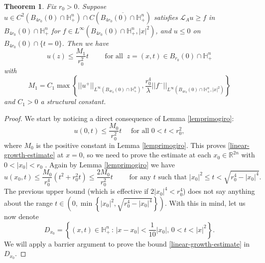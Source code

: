 \documentclass[12pt]{amsart}
\newtheorem{Theorem}{Theorem}[section]
\newcommand{\R}{{\mathbb R}}
\def \H {{\mathbb H}}
\def \L {\mathcal{L}}
\begin{document}
\begin{Theorem}\label{primadinocond}
Fix $r_0>0$. Suppose $u\in C^2(B_{4r_0}(0)\cap\H^n_+)\cap C(\overline{B_{4r_0}(0)\cap\H^n_+})$ satisfies $\L_A u \geq f$ in $B_{4r_0}(0)\cap\H^n_+$ for $f \in L^{\infty}(B_{4r_0}(0)\cap\H^n_+,|x|^2)$, and $u\leq 0$ on $B_{4r_0}(0) \cap \{t=0\}$. Then we have
\begin{equation}\label{linear-growth-estimate}
u(z)\leq \frac{M_1}{r^2_0} t \qquad \text{ for all } \ z=(x,t) \in B_{r_0}(0)\cap \H^n_+
\end{equation}
with
$$M_1=C_1\max\left\{ ||u^+||_{L^{\infty}(B_{4r_0}(0)\cap\H^n_+)}, 
\frac{r_0^4}{\lambda}||f^-||_{L^{\infty}(B_{4r_0}(0)\cap\H^n_+,|x|^2)}\right\}$$
and $C_1>0$ a structural constant.
\end{Theorem}
\begin{proof}
We start by noticing a direct consequence of Lemma \ref{lemprimogiro}:
\begin{equation}\label{atzero}
u(0,t)\leq \frac{M_0}{r^2_0} t \quad \text{ for all } 0<t<r_0^2,
\end{equation}
where $M_0$ is the positive constant in Lemma \ref{lemprimogiro}. This proves \eqref{linear-growth-estimate} at $x = 0$, so we need to prove the estimate at each $x_0\in\R^{2n}$ with $0<|x_0|<r_0$ . Again by Lemma \ref{lemprimogiro} we have
\begin{equation}\label{atx0sopra}
u(x_0,t)\leq \frac{M_0}{r^4_0} \left(t^2+r_0^2t \right )\leq \frac{2 M_0}{r^2_0} t \qquad \mbox{ for any } t \mbox{ such that } |x_0|^2\leq t<\sqrt{r_0^4 - |x_0|^4}.
\end{equation}
The previous upper bound (which is effective if $2|x_0|^4<r_0^4$) does not say anything about the range $t\in (0,\min\left\{|x_0|^2, \sqrt{r_0^4 - |x_0|^4}\right\})$. With this in mind, let us now denote
$$
D_{x_0}=\left\{(x,t)\in\H^n_+ \,:\, |x-x_0|< \frac{1}{10}|x_0|,\, 0<t< |x|^2\right\}.$$
We will apply a barrier argument to prove the bound \eqref{linear-growth-estimate} in $D_{x_0}$.


\end{proof}
\end{document}

